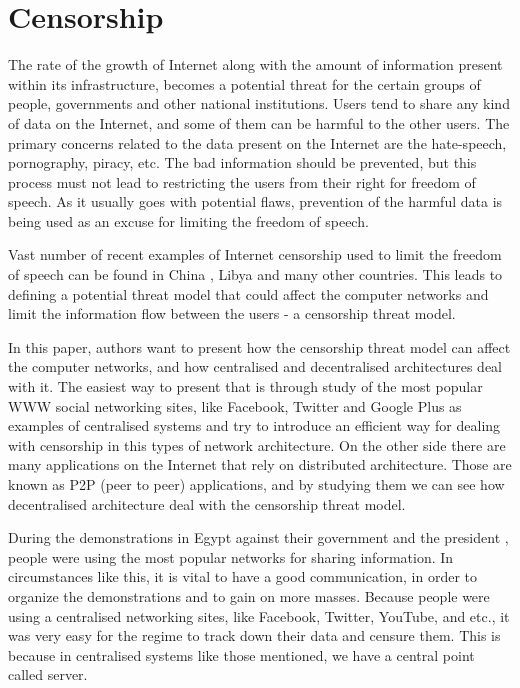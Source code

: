 \section{Censorship}
The rate of the growth of Internet along with the amount of information present within its infrastructure, becomes a potential threat for the certain groups of people, governments and other national institutions.
Users tend to share any kind of data on the Internet, and some of them can be harmful to the other users.
The primary concerns related to the data present on the Internet are the hate-speech, pornography, piracy, etc.
The bad information should be prevented, but this process must not lead to restricting the users from their right for freedom of speech.
As it usually goes with potential flaws, prevention of the harmful data is being used as an excuse for limiting the freedom of speech. 

Vast number of recent examples of Internet censorship used to limit the freedom of speech can be found in China \cite{canaves}, Libya \cite{dianotti2011} and many other countries. 
This leads to defining a potential threat model that could affect the computer networks and limit the information flow between the users - a censorship threat model.

In this paper, authors want to present how the censorship threat model can affect the computer networks, and how centralised and decentralised architectures deal with it.
The easiest way to present that is through study of the most popular WWW social networking sites, like Facebook, Twitter and Google Plus as examples of centralised systems and try to introduce an efficient way for dealing with censorship in this types of network architecture.
On the other side there are many applications on the Internet that rely on distributed architecture.
Those are known as P2P (peer to peer) applications, and by studying them we can see how decentralised architecture deal with the censorship threat model.

During the demonstrations in Egypt against their government and the president \cite{web:scialnetworkcriticalmass}, people were using the most popular networks for sharing information.
In circumstances like this, it is vital to have a good communication, in order to organize the demonstrations and to gain on more masses. 
Because people were using a centralised networking sites, like Facebook, Twitter, YouTube, and etc., it was very easy for the regime to track down their data and censure them.
This is because in centralised systems like those mentioned, we have a central point called server. 

